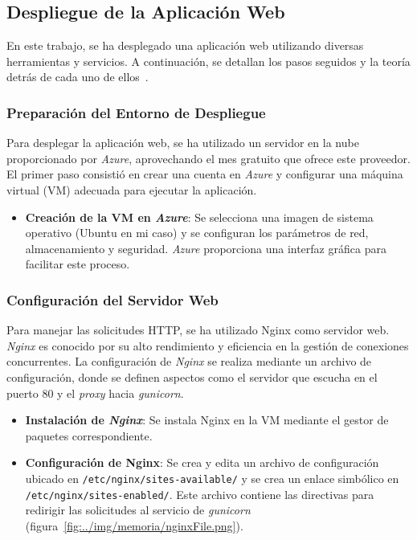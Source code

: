 \subsection{Despliegue de la Aplicación Web}

En este trabajo, se ha desplegado una aplicación web utilizando diversas herramientas y servicios. A continuación, se detallan los pasos seguidos y la teoría detrás de cada uno de ellos~\cite{deployApp}.

\subsubsection{Preparación del Entorno de Despliegue}

Para desplegar la aplicación web, se ha utilizado un servidor en la nube proporcionado por \textit{Azure}, aprovechando el mes gratuito que ofrece este proveedor. El primer paso consistió en crear una cuenta en \textit{Azure} y configurar una máquina virtual (VM) adecuada para ejecutar la aplicación.

\begin{itemize}
	\item \textbf{Creación de la VM en \textit{Azure}}: Se selecciona una imagen de sistema operativo (Ubuntu en mi caso) y se configuran los parámetros de red, almacenamiento y seguridad. \textit{Azure} proporciona una interfaz gráfica para facilitar este proceso.
\end{itemize}

\subsubsection{Configuración del Servidor Web}

Para manejar las solicitudes HTTP, se ha utilizado Nginx como servidor web. \textit{Nginx} es conocido por su alto rendimiento y eficiencia en la gestión de conexiones concurrentes. La configuración de \textit{Nginx} se realiza mediante un archivo de configuración, donde se definen aspectos como el servidor que escucha en el puerto 80 y el \textit{proxy} hacia \textit{gunicorn}.

\begin{itemize}
	\item \textbf{Instalación de \textit{Nginx}}: Se instala Nginx en la VM mediante el gestor de paquetes correspondiente.
	\item \textbf{Configuración de Nginx}: Se crea y edita un archivo de configuración ubicado en \texttt{/etc/nginx/sites-available/} y se crea un enlace simbólico en \texttt{/etc/nginx/sites-enabled/}. Este archivo contiene las directivas para redirigir las solicitudes al servicio de \textit{gunicorn} (figura~\ref{fig:../img/memoria/nginxFile.png}).
\end{itemize}

